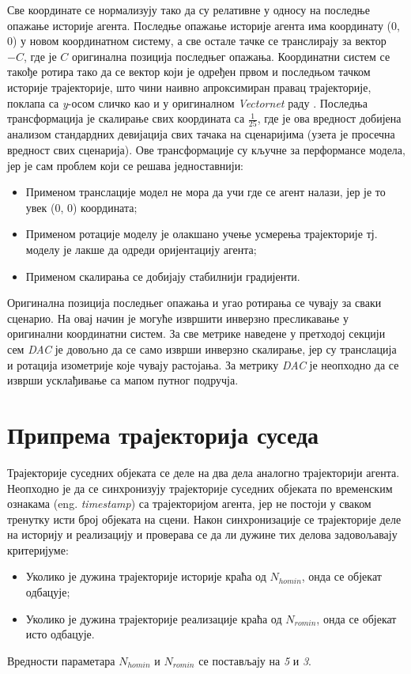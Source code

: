 \documentclass[11pt,oneside]{memoir}
\begin{document}
Све координате се нормализују тако да су релативне у односу на последње опажање историје агента. Последње опажање историје
агента има координату (0, 0) у новом координатном систему, а све остале тачке се транслирају за вектор $-C$, где је $C$ оригинална позиција
последњег опажања. Координатни систем се такође ротира тако да се вектор који је одређен првом и последњом тачком историје трајекторије,
што чини наивно апроксимиран правац трајекторије, поклапа са \textit{y}-осом сличко као и у оригиналном \textit{Vectornet} раду \cite{vectornet}. Последња
трансформација је скалирање свих координата са $\frac{1}{25}$, где је ова вредност добијена анализом стандардних девијација свих тачака
на сценаријима (узета је просечна вредност свих сценарија). Ове трансформације су кључне за перформансе модела, јер је сам проблем који се решава
једноставнији:
\begin{itemize}
  \item Применом транслације модел не мора да учи где се агент налази, јер је то увек (0, 0) координата;
  \item Применом ротације моделу је олакшано учење усмерења трајекторије тј. моделу је лакше да одреди оријентацију агента;
  \item Применом скалирања се добијају стабилнији градијенти.
\end{itemize}
Оригинална позиција последњег опажања и угао ротирања се чувају за сваки сценарио. На овај начин је могуће извршити
инверзно пресликавање у оригинални координатни систем. За све метрике наведене у претходој секцији сем \textit{DAC} је довољно
да се само изврши инверзно скалирање, јер су транслација и ротација изометрије које чувају растојања. За метрику \textit{DAC} је 
неопходно да се изврши усклађивање са мапом путног подручја.

\section{Припрема трајекторија суседа}

Трајекторије суседних објеката се деле на два дела аналогно трајекторији агента. Неопходно је да се синхронизују трајекторије 
суседних објеката по временским ознакама (eng. \textit{timestamp}) са трајекторијом агента, јер не постоји у сваком тренутку исти
број објеката на сцени. Након синхронизације се трајекторије деле на историју и реализацију и проверава се да ли дужине тих
делова задовољавају критеријуме:
\begin{itemize}
  \item Уколико је дужина трајекторије историје краћа од $N_{homin}$, онда се објекат одбацује;
  \item Уколико је дужина трајекторије реализације краћа од $N_{romin}$, онда се објекат исто одбацује.
\end{itemize}
Вредности параметара $N_{homin}$ и $N_{romin}$ се постављају на \textit{5} и \textit{3}.
\end{document}
